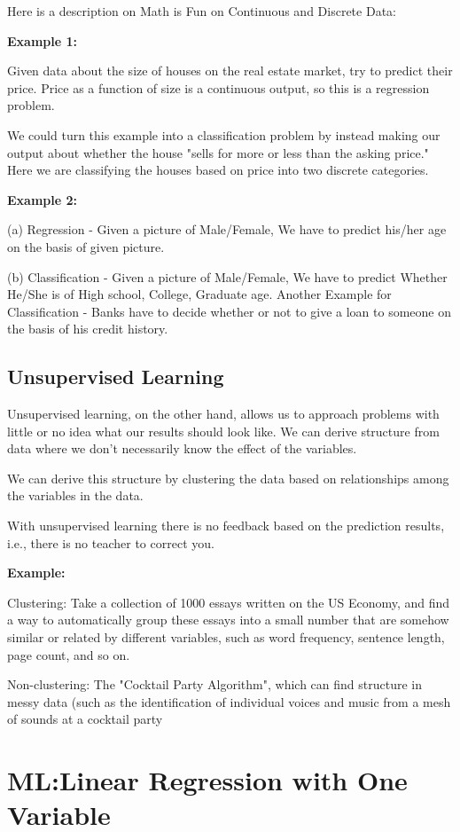 \documentclass{article}
\begin{document}
Here is a description on Math is Fun on Continuous and Discrete Data:

\noindent \textbf{Example 1:}

Given data about the size of houses on the real estate market, try to predict their price. Price as a function of size is a continuous output, so this is a regression problem.

We could turn this example into a classification problem by instead making our output about whether the house "sells for more or less than the asking price." Here we are classifying the houses based on price into two discrete categories.

\noindent \textbf{Example 2:}

(a) Regression - Given a picture of Male/Female, We have to predict his/her age on the basis of given picture.

(b) Classification - Given a picture of Male/Female, We have to predict Whether He/She is of High school, College, Graduate age. Another Example for Classification - Banks have to decide whether or not to give a loan to someone on the basis of his credit history.

\subsection{Unsupervised Learning}
Unsupervised learning, on the other hand, allows us to approach problems with little or no idea what our results should look like. We can derive structure from data where we don't necessarily know the effect of the variables.

We can derive this structure by clustering the data based on relationships among the variables in the data.

With unsupervised learning there is no feedback based on the prediction results, i.e., there is no teacher to correct you.

\noindent \textbf{Example:}

Clustering: Take a collection of 1000 essays written on the US Economy, and find a way to automatically group these essays into a small number that are somehow similar or related by different variables, such as word frequency, sentence length, page count, and so on.

Non-clustering: The "Cocktail Party Algorithm", which can find structure in messy data (such as the identification of individual voices and music from a mesh of sounds at a cocktail party

\section{ML:Linear Regression with One Variable}
\end{document}
